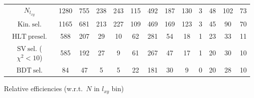 \documentclass[10pt,a4paper]{article}
\begin{document}
\begin{landscape}
{\begin{tabular}{c|cccc|cccc|cccc}
\midrule
$N_{l_{xy}}$ & 1280 & 755 & 238 & 243 & 115 & 492 & 187 & 130 & 3 & 48 & 102 & 73\\
$\mathrm{Kin.\ sel.}$ & 1165 & 681 & 213 & 227 & 109 & 469 & 169 & 123 & 3 & 45 & 90 & 70\\
$\mathrm{HLT\ presel.}$ & 588 & 207 & 29 & 10 & 62 & 281 & 54 & 18 & 1 & 23 & 33 & 11\\
$\mathrm{SV\ sel.}$ ($\chi^2{<}10$) & 585 & 192 & 27 & 9 & 61 & 267 & 47 & 17 & 1 & 20 & 30 & 10\\
$\mathrm{BDT\ sel.}$ & 84 & 47 & 5 & 5 & 22 & 181 & 30 & 9 & 0 & 20 & 28 & 10\\
\bottomrule
\end{tabular}}

\vspace{18pt}

Relative efficiencies (w.r.t.\ $N$ in $l_{xy}$ bin)


\end{landscape}
\end{document}
